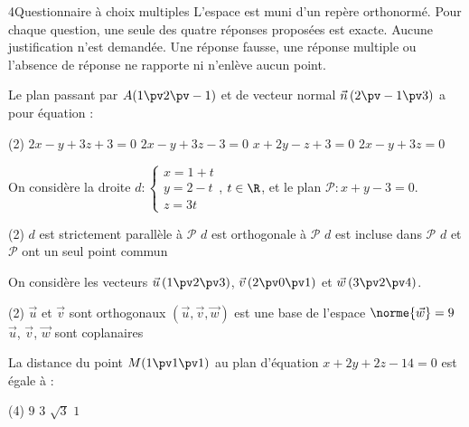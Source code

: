 \begin{exoBac}{4}{Questionnaire à choix multiples}
L'espace est muni d'un repère orthonormé. Pour chaque question, une seule des quatre réponses proposées est exacte. Aucune
justification n'est demandée. Une réponse fausse, une réponse multiple ou l'absence de réponse ne rapporte ni n'enlève aucun point.
\begin{questions}
  \item Le plan passant par $A(1\pv2\pv-1)$ et de vecteur normal $\vec n\,(2\pv-1\pv3)$ a pour équation :
\begin{tasks}[label=\alph*)](2)
  \task $2x-y+3z+3=0$
  \task $2x-y+3z-3=0$
  \task $x+2y-z+3=0$
  \task $2x-y+3z=0$
\end{tasks}
  \item On considère la droite $d:\begin{cases}x=1+t\\y=2-t\\z=3t\end{cases}$, $t\in\R$, et le plan $\mathcal{P}:x+y-3=0$.
\begin{tasks}[label=\alph*)](2)
  \task $d$ est strictement parallèle à $\mathcal{P}$
  \task $d$ est orthogonale à $\mathcal{P}$
  \task $d$ est incluse dans $\mathcal{P}$
  \task $d$ et $\mathcal{P}$ ont un seul point commun
\end{tasks}
  \item On considère les vecteurs $\vec u\,(1\pv2\pv3)$, $\vec v\,(2\pv0\pv1)$ et $\vec w\,(3\pv2\pv4)$.
\begin{tasks}[label=\alph*)](2)
  \task $\vec u$ et $\vec v$ sont orthogonaux
  \task $(\vec u,\vec v,\vec w)$ est une base de l'espace
  \task $\norme{\vec w}=9$
  \task $\vec u$, $\vec v$, $\vec w$ sont coplanaires
\end{tasks}
  \item La distance du point $M(1\pv1\pv1)$ au plan d'équation $x+2y+2z-14=0$ est égale à :
\begin{tasks}[label=\alph*)](4)
  \task $9$
  \task $3$
  \task $\sqrt3$
  \task $1$
\end{tasks}
\end{questions}
\end{exoBac}

